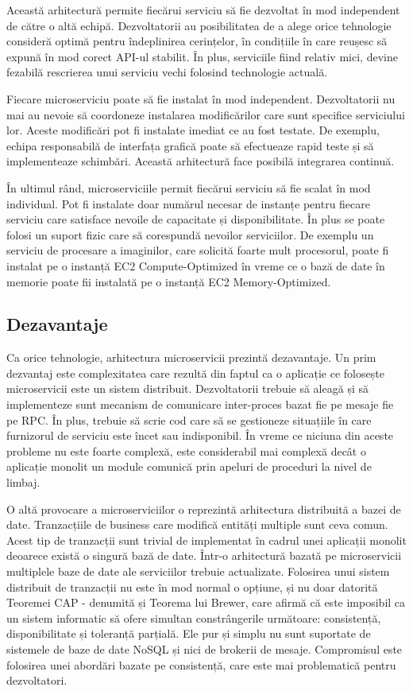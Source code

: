 \documentclass[12pt, a4paper, oneside, romanian]{teza-upb}
\begin{document}
Această arhitectură permite fiecărui serviciu să fie dezvoltat în mod independent de către o altă echipă. Dezvoltatorii au posibilitatea de a alege orice tehnologie consideră optimă pentru îndeplinirea cerințelor, în condițiile în care reușesc să expună în mod corect API-ul stabilit. În plus, serviciile fiind relativ mici, devine fezabilă rescrierea unui serviciu vechi folosind technologie actuală. 

Fiecare microserviciu poate să fie instalat în mod independent. Dezvoltatorii nu mai au nevoie să coordoneze instalarea modificărilor care sunt specifice serviciului lor. Aceste modificări pot fi instalate imediat ce au fost testate. De exemplu, echipa responsabilă de interfața grafică poate să efectueaze rapid teste și să implementeaze schimbări. Această arhitectură face posibilă integrarea continuă. 

În ultimul rând, microserviciile permit fiecărui serviciu să fie scalat în mod individual. Pot fi instalate doar numărul necesar de instanțe pentru fiecare serviciu care satisface nevoile de capacitate și disponibilitate. În plus se poate folosi un suport fizic care să corespundă nevoilor serviciilor. De exemplu un serviciu de procesare a imaginilor, care solicită foarte mult procesorul, poate fi instalat pe o instanță EC2 Compute-Optimized în vreme ce o bază de date în memorie poate fii instalată pe o instanță EC2 Memory-Optimized.

\subsection{Dezavantaje}

Ca orice tehnologie, arhitectura microservicii prezintă dezavantaje. Un prim dezvantaj este complexitatea care rezultă din faptul ca o aplicație ce folosește microservicii este un sistem distribuit. Dezvoltatorii trebuie să aleagă și să implementeze sunt mecanism de comunicare inter-proces bazat fie pe mesaje fie pe RPC. În plus, trebuie să scrie cod care să se gestioneze situațiile în care furnizorul de serviciu este încet sau indisponibil. În vreme ce niciuna din aceste probleme nu este foarte complexă, este considerabil mai complexă decât o aplicație monolit un module comunică prin apeluri de proceduri la nivel de limbaj.   

O altă provocare a microserviciilor o reprezintă arhitectura distribuită a bazei de date. Tranzacțiile de business care modifică entități multiple sunt ceva comun. Acest tip de tranzacții sunt trivial de implementat în cadrul unei aplicații monolit deoarece există o singură bază de date. Într-o arhitectură bazată pe microservicii multiplele baze de date ale serviciilor trebuie actualizate. Folosirea unui sistem distribuit de tranzacții nu este în mod normal o opțiune, și nu doar datorită Teoremei CAP - denumită și Teorema lui Brewer, care afirmă că este imposibil ca un sistem informatic să ofere simultan constrângerile următoare: consistență, disponibilitate și toleranță parțială. Ele pur și simplu nu sunt suportate de sistemele de baze de date NoSQL și nici de brokerii de mesaje. Compromisul este folosirea unei abordări bazate pe consistență, care este mai problematică pentru dezvoltatori. 
\end{document}
